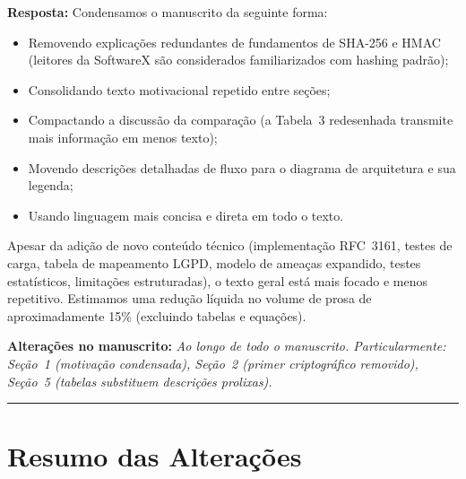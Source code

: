\documentclass[11pt,a4paper]{article}
\newcommand{\response}[1]{\par\noindent\textcolor{responsecolor}{\textbf{Resposta:}} #1}
\newcommand{\change}[1]{\par\noindent\textcolor{changecolor}{\textbf{Alterações no manuscrito:}} \textit{#1}}
\begin{document}
\response{Condensamos o manuscrito da seguinte forma:}

\begin{itemize}[nosep]
  \item Removendo explicações redundantes de fundamentos de SHA-256 e HMAC (leitores da SoftwareX são considerados familiarizados com hashing padrão);
  \item Consolidando texto motivacional repetido entre seções;
  \item Compactando a discussão da comparação (a Tabela~3 redesenhada transmite mais informação em menos texto);
  \item Movendo descrições detalhadas de fluxo para o diagrama de arquitetura e sua legenda;
  \item Usando linguagem mais concisa e direta em todo o texto.
\end{itemize}

\noindent Apesar da adição de novo conteúdo técnico (implementação RFC~3161, testes de carga, tabela de mapeamento LGPD, modelo de ameaças expandido, testes estatísticos, limitações estruturadas), o texto geral está mais focado e menos repetitivo. Estimamos uma redução líquida no volume de prosa de aproximadamente 15\% (excluindo tabelas e equações).

\change{Ao longo de todo o manuscrito. Particularmente: Seção~1 (motivação condensada), Seção~2 (primer criptográfico removido), Seção~5 (tabelas substituem descrições prolixas).}

\bigskip
\hrule
\bigskip

\section*{Resumo das Alterações}
\end{document}
